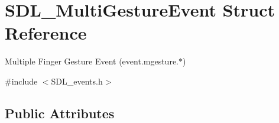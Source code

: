 \hypertarget{struct_s_d_l___multi_gesture_event}{}\section{S\+D\+L\+\_\+\+Multi\+Gesture\+Event Struct Reference}
\label{struct_s_d_l___multi_gesture_event}


Multiple Finger Gesture Event (event.\+mgesture.$\ast$)  




{\ttfamily \#include $<$S\+D\+L\+\_\+events.\+h$>$}

\subsection*{Public Attributes}
